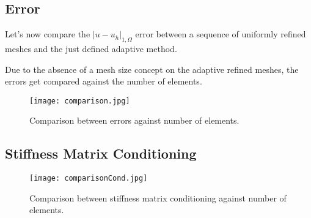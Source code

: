 \subsection{Error}

Let's now compare the $|u - u_h|_{1, \Omega}$ error between a sequence of uniformly refined meshes and the just defined adaptive method.

Due to the absence of a mesh size concept on the adaptive refined meshes, the errors get compared against the number of elements.

\begin{figure}[!ht]
	\centering
	\texttt{[image: comparison.jpg]}
	\caption{Comparison between errors against number of elements.}
\end{figure}

\newpage
\begin{multicols}{2}
	
\end{multicols}

\newpage
\subsection{Stiffness Matrix Conditioning}

\begin{figure}[!ht]
	\centering
	\texttt{[image: comparisonCond.jpg]}
	\caption{Comparison between stiffness matrix conditioning against number of elements.}
\end{figure}

\newpage
\begin{multicols}{2}
	
\end{multicols}